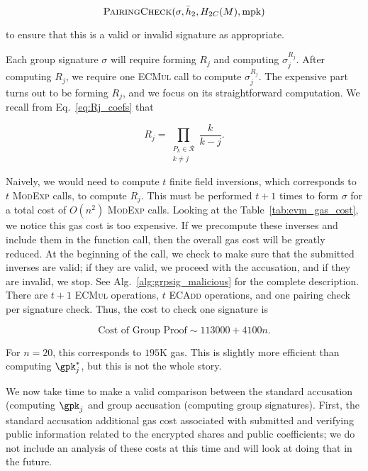 \begin{equation}
    \textsc{PairingCheck}(\sigma, \bar{h}_{2}, H_{2C}(M), \text{mpk})
\end{equation}

\noindent
to ensure that this is a valid or invalid signature as appropriate.

Each group signature $\sigma$ will require forming $R_{j}$
and computing $\sigma_{j}^{R_{j}}$.
After computing $R_{j}$, we require one \textsc{ECMul} call
to compute $\sigma_{j}^{R_{j}}$.
The expensive part turns out to be forming $R_{j}$,
and we focus on its straightforward computation.
We recall from Eq.~\eqref{eq:Rj_coefs} that

\begin{equation}
    R_{j} = \prod_{\substack{P_{k}\in\mathcal{R} \\ k\ne j}} \frac{k}{k-j}.
\end{equation}

\noindent
Naively, we would need to compute $t$ finite field inversions,
which corresponds to $t$ \textsc{ModExp} calls, to compute
$R_{j}$.
This must be performed $t+1$ times to form $\sigma$
for a total cost of $O(n^{2})$ \textsc{ModExp} calls.
Looking at the Table~\ref{tab:evm_gas_cost}, we notice this gas cost
is too expensive.
If we precompute these inverses and include them
in the function call, then the overall gas cost will be greatly reduced.
At the beginning of the call, we check to make sure that the submitted
inverses are valid; if they are valid, we proceed with the
accusation, and if they are invalid, we stop.
See Alg.~\ref{alg:grpsig_malicious} for the complete description.
There are $t+1$ \textsc{ECMul} operations, $t$ \textsc{ECAdd} operations,
and one pairing check per signature check.
Thus, the cost to check one signature is

\begin{equation}
    \text{Cost of Group Proof} \sim 113000 + 4100n.
    \label{eq:cost_group}
\end{equation}

\noindent
For $n=20$, this corresponds to $195$K gas.
This is slightly more efficient than computing $\gpk_{j}^{*}$,
but this is not the whole story.

We now take time to make a valid comparison between the
standard accusation (computing $\gpk_{j}$ and group accusation
(computing group signatures).
First, the standard accusation additional gas cost associated
with submitted and verifying public information related to the
encrypted shares and public coefficients;
we do not include an analysis of these costs at this time
and will look at doing that in the future.

